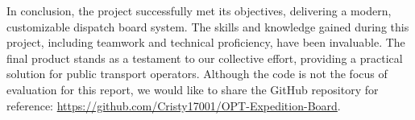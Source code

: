 \documentclass[10pt]{article}
\begin{document}
        In conclusion, the project successfully met its objectives, delivering a modern, customizable dispatch board system. The skills and knowledge gained during this project, including teamwork and technical proficiency, have been invaluable. The final product stands as a testament to our collective effort, providing a practical solution for public transport operators. Although the code is not the focus of evaluation for this report, we would like to share the GitHub repository for reference: \url{https://github.com/Cristy17001/OPT-Expedition-Board}.


        
        
        \nocite{*}
\end{document}

